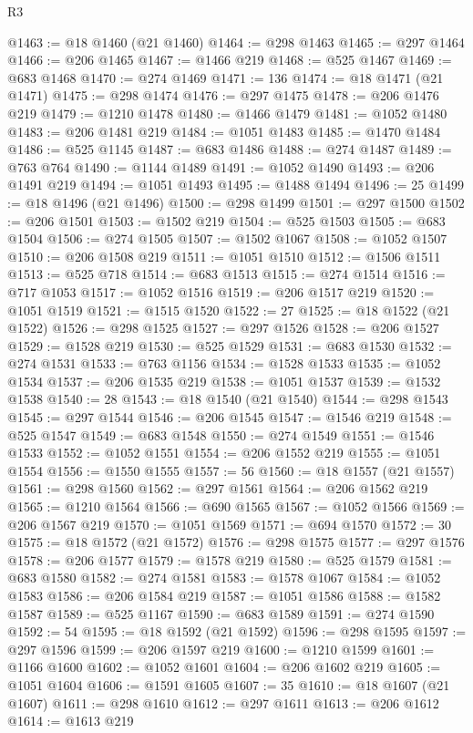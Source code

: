 \begin{lexlean}{R3}
\begin{coremodule}
@1463 := @18 @1460 (@21 @1460)
@1464 := @298 @1463
@1465 := @297 @1464
@1466 := @206 @1465
@1467 := @1466 @219
@1468 := @525 @1467
@1469 := @683 @1468
@1470 := @274 @1469
@1471 := 136
@1474 := @18 @1471 (@21 @1471)
@1475 := @298 @1474
@1476 := @297 @1475
@1478 := @206 @1476 @219
@1479 := @1210 @1478
@1480 := @1466 @1479
@1481 := @1052 @1480
@1483 := @206 @1481 @219
@1484 := @1051 @1483
@1485 := @1470 @1484
@1486 := @525 @1145
@1487 := @683 @1486
@1488 := @274 @1487
@1489 := @763 @764
@1490 := @1144 @1489
@1491 := @1052 @1490
@1493 := @206 @1491 @219
@1494 := @1051 @1493
@1495 := @1488 @1494
@1496 := 25
@1499 := @18 @1496 (@21 @1496)
@1500 := @298 @1499
@1501 := @297 @1500
@1502 := @206 @1501
@1503 := @1502 @219
@1504 := @525 @1503
@1505 := @683 @1504
@1506 := @274 @1505
@1507 := @1502 @1067
@1508 := @1052 @1507
@1510 := @206 @1508 @219
@1511 := @1051 @1510
@1512 := @1506 @1511
@1513 := @525 @718
@1514 := @683 @1513
@1515 := @274 @1514
@1516 := @717 @1053
@1517 := @1052 @1516
@1519 := @206 @1517 @219
@1520 := @1051 @1519
@1521 := @1515 @1520
@1522 := 27
@1525 := @18 @1522 (@21 @1522)
@1526 := @298 @1525
@1527 := @297 @1526
@1528 := @206 @1527
@1529 := @1528 @219
@1530 := @525 @1529
@1531 := @683 @1530
@1532 := @274 @1531
@1533 := @763 @1156
@1534 := @1528 @1533
@1535 := @1052 @1534
@1537 := @206 @1535 @219
@1538 := @1051 @1537
@1539 := @1532 @1538
@1540 := 28
@1543 := @18 @1540 (@21 @1540)
@1544 := @298 @1543
@1545 := @297 @1544
@1546 := @206 @1545
@1547 := @1546 @219
@1548 := @525 @1547
@1549 := @683 @1548
@1550 := @274 @1549
@1551 := @1546 @1533
@1552 := @1052 @1551
@1554 := @206 @1552 @219
@1555 := @1051 @1554
@1556 := @1550 @1555
@1557 := 56
@1560 := @18 @1557 (@21 @1557)
@1561 := @298 @1560
@1562 := @297 @1561
@1564 := @206 @1562 @219
@1565 := @1210 @1564
@1566 := @690 @1565
@1567 := @1052 @1566
@1569 := @206 @1567 @219
@1570 := @1051 @1569
@1571 := @694 @1570
@1572 := 30
@1575 := @18 @1572 (@21 @1572)
@1576 := @298 @1575
@1577 := @297 @1576
@1578 := @206 @1577
@1579 := @1578 @219
@1580 := @525 @1579
@1581 := @683 @1580
@1582 := @274 @1581
@1583 := @1578 @1067
@1584 := @1052 @1583
@1586 := @206 @1584 @219
@1587 := @1051 @1586
@1588 := @1582 @1587
@1589 := @525 @1167
@1590 := @683 @1589
@1591 := @274 @1590
@1592 := 54
@1595 := @18 @1592 (@21 @1592)
@1596 := @298 @1595
@1597 := @297 @1596
@1599 := @206 @1597 @219
@1600 := @1210 @1599
@1601 := @1166 @1600
@1602 := @1052 @1601
@1604 := @206 @1602 @219
@1605 := @1051 @1604
@1606 := @1591 @1605
@1607 := 35
@1610 := @18 @1607 (@21 @1607)
@1611 := @298 @1610
@1612 := @297 @1611
@1613 := @206 @1612
@1614 := @1613 @219

\end{coremodule}
\end{lexlean}
